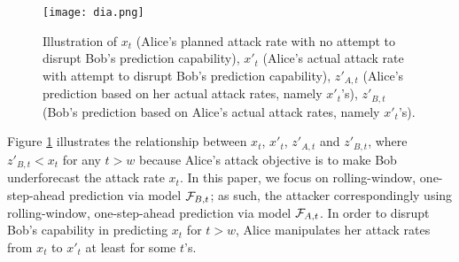 \documentclass[journal]{IEEEtran}
\begin{document}
\begin{itemize}

\end{itemize} 


\begin{figure}[htbp!]
\centering
\texttt{[image: dia.png]}
\caption{Illustration of $x_t$ (Alice's planned attack rate with no attempt to disrupt Bob's prediction capability), $x'_t$ (Alice's actual attack rate with attempt to disrupt Bob's prediction capability), %
$z'_{A,t}$ (Alice's prediction based on her actual attack rates, namely $x'_t$'s), $z'_{B,t}$ (Bob's prediction based on Alice's actual attack rates, namely $x'_t$'s).}
\label{fig:goal}
\end{figure}

Figure \ref{fig:goal} illustrates the relationship between $x_t$, $x'_t$, %
$z'_{A,t}$ and $z'_{B,t}$,
where $z'_{B,t}<x_t$ for any $t>w$ because Alice's attack objective is to make Bob underforecast the attack rate $x_t$. {\color{purple}In this paper, we focus on rolling-window, one-step-ahead prediction via model ${\cal F}_{B,t}$; as such, the attacker correspondingly using rolling-window, one-step-ahead prediction via model ${\cal F}_{A,t}$.}
In order to disrupt Bob's capability in predicting $x_t$ for $t>w$, Alice manipulates her attack rates from $x_t$ to $x'_t$ at least for some $t$'s. 
\end{document}
